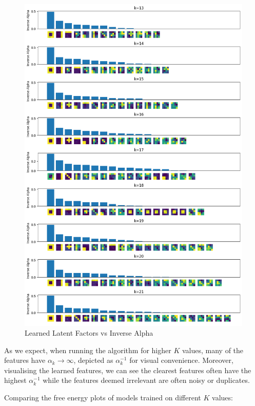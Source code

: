 \documentclass[12pt]{article}
\begin{document}
\newpage
\begin{figure}[h]
\centering
\includegraphics[scale=0.47]{outputs/q4/b-2-latent-factors-comparison}
\caption{Learned Latent Factors vs Inverse Alpha}
\label{fig:}
\end{figure}
As we expect, when running the algorithm for higher $K$ values, many of the features have $\alpha_k \rightarrow \infty$, depicted as $\alpha^{-1}_k$ for visual convenience. Moreover, visualising the learned features, we can see the clearest features often have the highest $\alpha^{-1}_k$ while the features deemed irrelevant are often noisy or duplicates.


\newpage

Comparing the free energy plots of models trained on different $K$ values:
\end{document}
